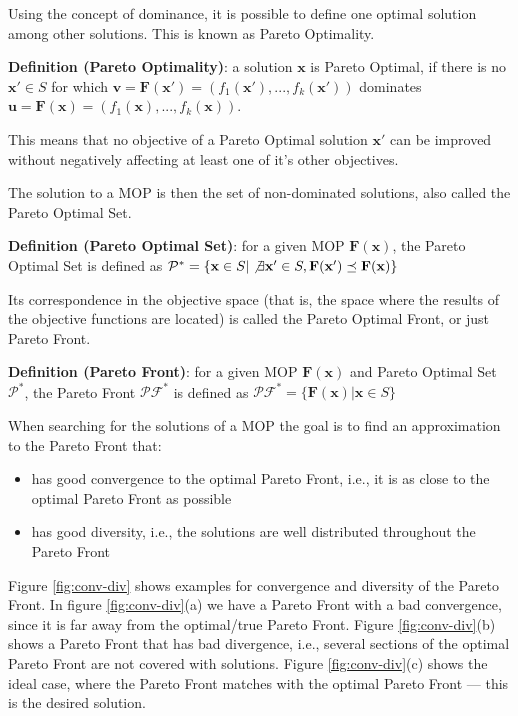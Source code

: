 Using the concept of dominance, it is possible to define one optimal solution among other solutions. This is known as Pareto Optimality.

\noindent\textbf{Definition (Pareto Optimality)}: a solution $\mathbf{x}$ is Pareto Optimal, if there is no $\mathbf{x'} \in S$ for which $\mathbf{v} = \mathbf{F}(\mathbf{x'}) = (f_1(\mathbf{x'}),...,f_k(\mathbf{x'}))$ dominates $\mathbf{u} = \mathbf{F}(\mathbf{x}) = (f_1(\mathbf{x}),...,f_k(\mathbf{x}))$.

This means that no objective of a Pareto Optimal solution $\mathbf{x'}$ can be improved without negatively affecting at least one of it's other objectives.

The solution to a MOP is then the set of non-dominated solutions, also called the Pareto Optimal Set.

\noindent\textbf{Definition (Pareto Optimal Set)}: for a given MOP $\mathbf{F}(\mathbf{x})$, the Pareto Optimal Set is defined as $\mathcal{P}^* = \{\mathbf{x} \in S | \not\exists \mathbf{x'} \in S, \mathbf{F}(\mathbf{x'}) \preceq \mathbf{F}(\mathbf{x}) \}$

Its correspondence in the objective space (that is, the space where the results of the objective functions are located) is called the Pareto Optimal Front, or just Pareto Front.

\noindent\textbf{Definition (Pareto Front)}: for a given MOP $\mathbf{F}(\mathbf{x})$ and Pareto Optimal Set $\mathcal{P}^*$, the Pareto Front $\mathcal{PF}^*$ is defined as $\mathcal{PF}^* = \{\mathbf{F}(\mathbf{x}) | \mathbf{x} \in S \}$

When searching for the solutions of a MOP the goal is to find an approximation to the Pareto Front that:
\begin{itemize}
  \item has good convergence to the optimal Pareto Front, i.e., it is as close to the optimal Pareto Front as possible
  \item has good diversity, i.e., the solutions are well distributed throughout the Pareto Front
\end{itemize}

Figure \ref{fig:conv-div} shows examples for convergence and diversity of the Pareto Front. In figure \ref{fig:conv-div}(a) we have a Pareto Front with a bad convergence, since it is far away from the optimal/true Pareto Front. Figure \ref{fig:conv-div}(b) shows a Pareto Front that has bad divergence, i.e., several sections of the optimal Pareto Front are not covered with solutions. Figure \ref{fig:conv-div}(c) shows the ideal case, where the Pareto Front matches with the optimal Pareto Front --- this is the desired solution.


